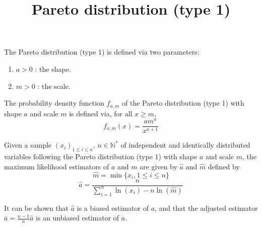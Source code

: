 \documentclass[12pt]{article}
\title{Pareto distribution (type 1)}
\begin{document}
\maketitle

The Pareto distribution (type 1) is defined via two parameters:
\begin{enumerate}
  \item $a > 0$ : the shape.
  \item $m > 0$ : the scale.
\end{enumerate}

The probability density function $f_{a,m}$ of the Pareto distribution (type 1) with shape $a$ and scale $m$ is defined via, for all $x \geq m$,
$$ f_{a,m}(x) = \frac{a m^{a}}{x^{a+1}} $$

Given a sample $(x_i)_{1 \leq i \leq n}$, $n \in \mathbb{N}^*$ of independent and identically distributed variables following the Pareto distribution (type 1) with shape $a$ and scale $m$,
the maximum likelihood estimators of $a$ and $m$ are given by $\hat{a}$ and $\hat{m}$ defined by
$$\hat{m} = \min \{ x_{i}, 1 \leq i \leq n \}$$
$$\hat{a} = \frac{n}{\sum_{i = 1}^{n}\ln(x_i) - n \ln(\hat{m})}$$

It can be shown that $\hat{a}$ is a biased estimator of $a$, and that the adjusted estimator $\bar{a} = \frac{n-1}{n} \hat{a}$ is an unbiased
estimator of $a$.
\end{document}
